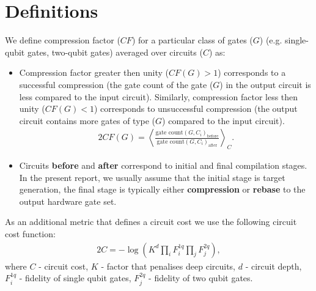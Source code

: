 \documentclass{report}%
\begin{document}
%
\section{Definitions}%
\label{sec:Definitions}%
We define compression factor ($CF$) for a particular class of gates ($G$)
                    (e.g. single-qubit gates, two-qubit gates) averaged over circuits ($C$) as:%
\begin{itemize}%
\item%
Compression factor greater then unity ($CF(G)>1$) corresponds to a successful compression
                        (the gate count of the gate ($G$) in the output circuit is less compared to the input circuit).
                        Similarly, compression factor less then unity ($CF(G)<1$) corresponds to
                        unsuccessful compression (the output circuit contains more gates of type ($G$)
                        compared to the input circuit).%
\begin{alignat*}{2}%
CF(G) =\left \langle  \frac{\textrm{gate count}
                        (G, C_i)_{\textrm{before}}}{\textrm{gate count}(G, C_i)_{\textrm{after}}} \right\rangle_{C}.%
\end{alignat*}%
\item%
Circuits \textbf{before} and \textbf{after} correspond to initial and
                        final compilation stages. In the present report, we usually assume that the initial stage is
                        target generation, the final stage is typically either \textbf{compression} or
                        \textbf{rebase} to the output hardware gate set.
\end{itemize}%
As an additional metric that defines a circuit cost we use the following
                    circuit cost function:%
\begin{alignat*}{2}%
C = -\log{\left(K^d \prod_i F^{1q}_i \prod_j F^{2q}_j\right)},%
\end{alignat*}%
where $C$ - circuit cost, $K$ - factor that penalises deep circuits,
                    $d$ - circuit depth, $F^{1q}_i$ - fidelity of single qubit gates,
                    $F^{2q}_j$ - fidelity of two qubit gates. 

%
\end{document}
